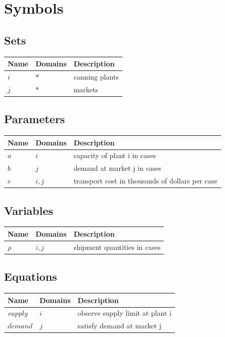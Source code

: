 \documentclass[11pt]{article}
\begin{document}
\section*{Symbols}


\subsection*{Sets}
\begin{tabularx}{\textwidth}{| l | l | X |}
\hline
\textbf{Name} & \textbf{Domains} & \textbf{Description}\\
\hline
\endhead

$i$ & $*$ & canning plants\\
$j$ & $*$ & markets\\
\hline
\end{tabularx}
\subsection*{Parameters}
\begin{tabularx}{\textwidth}{| l | l | X |}
\hline
\textbf{Name} & \textbf{Domains} & \textbf{Description}\\
\hline
\endhead

$a$ & $i$ & capacity of plant i in cases\\
$b$ & $j$ & demand at market j in cases\\
$c$ & $i,j$ & transport cost in thousands of dollars per case\\
\hline
\end{tabularx}
\subsection*{Variables}
\begin{tabularx}{\textwidth}{| l | l | X |}
\hline
\textbf{Name} & \textbf{Domains} & \textbf{Description}\\
\hline
\endhead

$ρ$ & $i,j$ & shipment quantities in cases\\
\hline
\end{tabularx}
\subsection*{Equations}
\begin{tabularx}{\textwidth}{| l | l | X |}
\hline
\textbf{Name} & \textbf{Domains} & \textbf{Description}\\
\hline
\endhead

$supply$ & $i$ & observe supply limit at plant i\\
$demand$ & $j$ & satisfy demand at market j\\
\hline
\end{tabularx}
\end{document}
